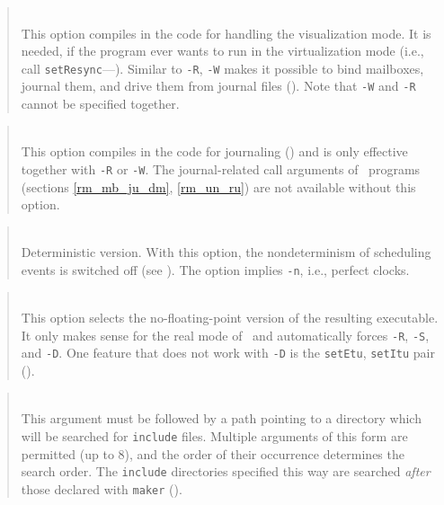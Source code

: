 \begin{quote}
\noindent{}\\ \hspace{0in}
This option compiles in the code for handling the visualization mode.
It is needed, if the program ever wants to run in the virtualization mode
(i.e., call {\tt setResync}---).
Similar to {\tt -R}, {\tt -W} makes it possible to bind mailboxes, journal
them, and drive them from journal files ().
Note that {\tt -W} and {\tt -R} cannot be specified together.
\end{quote}

\begin{quote}
\noindent{}\\ \hspace{0in}
This option compiles in the code for journaling () and is
only effective together with {\tt -R} or {\tt -W}.
The journal-related call arguments of \smurph\ programs (sections
\ref{rm_mb_ju_dm}, \ref{rm_un_ru}) are not available without this option.
\end{quote}

\begin{quote}
\noindent{}\\ \hspace{0in}
Deterministic version.
With this option, the nondeterminism of scheduling events is switched off
(see ).
The option implies {\tt -n}, i.e., perfect clocks.
\end{quote}\medskip

\begin{quote}
\noindent{}\\ \hspace{0in}
This option selects the no-floating-point version of the resulting
executable.
It only makes sense for the real mode of \smurph\ and automatically
forces {\tt -R}, {\tt -S}, and {\tt -D}.
One feature that does not work with {\tt -D} is the {\tt setEtu},
{\tt setItu} pair ().
\end{quote}\medskip

\begin{quote}
\noindent{}\\ \hspace{0in}
This argument must be followed by a path pointing to a directory which
will be searched for {\tt include} files.
Multiple arguments of this form are permitted (up to 8), and the order of their
occurrence determines the search order.
The {\tt include} directories specified this way are searched {\em after\/}
those declared with {\tt maker} ().
\end{quote}\medskip

